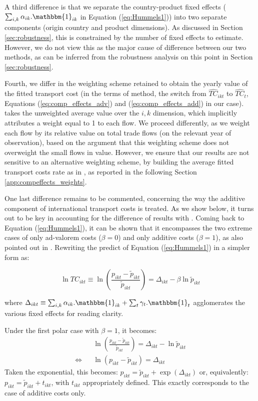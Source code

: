 \documentclass[a4paper,11pt]{article}
\begin{document}
A third difference is that we separate the country-product fixed effects ($\sum_{i,k}\alpha_{ik}.\mathbbm{1}_{ik}$ in Equation (\ref{eq:Hummels1})) into two separate components (origin country and product dimensions).
As discussed in Section \ref{sec:robustness}, this is constrained by the number of fixed effects to estimate.
However, we do not view this as the major cause of difference between our two methods, as can be inferred from the robustness analysis on this point in Section \ref{sec:robustness}.

Fourth, we differ in the weighting scheme retained to obtain the yearly value of the fitted transport cost (in the terms of \cite{hummels2007} method, the switch from $\widehat{TC}_{ikt}$ to $\widehat{TC}_{t}$, Equations (\ref{eq:comp_effects_adv}) and (\ref{eq:comp_effects_add}) in our case).
\cite{hummels2007} takes the unweighted average value over the $i,k$ dimension, which implicitly attributes a weight equal to 1 to each flow.
We proceed differently, as we weight each flow by its relative value on total trade flows (on the relevant year of observation), based on the argument that this weighting scheme does not overweight the small flows in value. However, we ensure that our results are not sensitive to an alternative weighting scheme, by building the average fitted transport costs rate as in \cite{hummels2007}, as reported in the following Section \ref{app:compeffects_weights}.

One last difference remains to be commented, concerning the way the additive component of international transport costs is treated.
As we show below, it turns out to be key in accounting for the difference of results with \cite{hummels2007}.
Coming back to Equation (\ref{eq:Hummels1}), it can be shown that it encompasses the two extreme cases of only ad-valorem costs ($\beta = 0$) and only additive costs ($\beta=1$), as also pointed out in \cite{hummels_skiba}. Rewriting the predict of Equation (\ref{eq:Hummels1}) in a simpler form as:

$$\ln TC_{ikt} \equiv \ln \left(\frac{p_{ikt}- \widetilde{p}_{ikt}}{\widetilde{p}_{ikt}} \right) = \Delta_{ikt}- \beta \ln \widetilde{p}_{ikt} $$

\noindent where $\Delta_{ikt} \equiv \sum_{i,k}\alpha_{ik}.\mathbbm{1}_{ik}+ \sum_{t}\gamma_{t}.\mathbbm{1}_{t}$ agglomerates the various fixed effects for reading clarity.

Under the first polar case with $\beta = 1$, it becomes:
\begin{eqnarray*}
&&\ln \left(\frac{p_{ikt}- \widetilde{p}_{ikt}}{\widetilde{p}_{ikt}} \right) = \Delta_{ikt}- \ln \widetilde{p}_{ikt} \\
\Leftrightarrow && \ln (p_{ikt}- \widetilde{p}_{ikt}) = \Delta_{ikt}
\end{eqnarray*}
\noindent Taken the exponential, this becomes: $p_{ikt} = \widetilde{p}_{ikt} + \exp(\Delta_{ikt})$ or, equivalently: $p_{ikt} = \widetilde{p}_{ikt} + t_{ikt}$, with $t_{ikt}$ appropriately defined. This exactly corresponds to the case of additive costs only.
\end{document}
